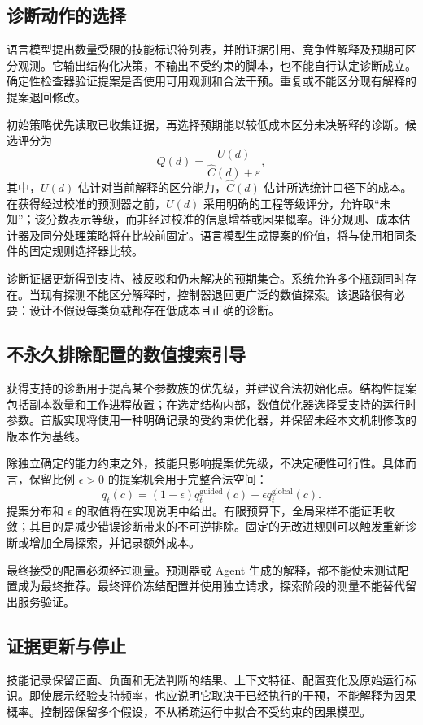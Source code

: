 \documentclass[preprint,12pt]{elsarticle}
\begin{document}
\subsection{诊断动作的选择}
语言模型提出数量受限的技能标识符列表，并附证据引用、竞争性解释及预期可区分观测。它输出结构化决策，不输出不受约束的脚本，也不能自行认定诊断成立。确定性检查器验证提案是否使用可用观测和合法干预。重复或不能区分现有解释的提案退回修改。

初始策略优先读取已收集证据，再选择预期能以较低成本区分未决解释的诊断。候选评分为
\begin{equation}
 Q(d)=\frac{U(d)}{\widehat C(d)+\varepsilon},
\end{equation}
其中，$U(d)$ 估计对当前解释的区分能力，$\widehat C(d)$ 估计所选统计口径下的成本。在获得经过校准的预测器之前，$U(d)$ 采用明确的工程等级评分，允许取“未知”；该分数表示等级，而非经过校准的信息增益或因果概率。评分规则、成本估计器及同分处理策略将在比较前固定。语言模型生成提案的价值，将与使用相同条件的固定规则选择器比较。

诊断证据更新得到支持、被反驳和仍未解决的预期集合。系统允许多个瓶颈同时存在。当现有探测不能区分解释时，控制器退回更广泛的数值探索。该退路很有必要：设计不假设每类负载都存在低成本且正确的诊断。

\subsection{不永久排除配置的数值搜索引导}
获得支持的诊断用于提高某个参数族的优先级，并建议合法初始化点。结构性提案包括副本数量和工作进程放置；在选定结构内部，数值优化器选择受支持的运行时参数。首版实现将使用一种明确记录的受约束优化器，并保留未经本文机制修改的版本作为基线。

除独立确定的能力约束之外，技能只影响提案优先级，不决定硬性可行性。具体而言，保留比例 $\epsilon>0$ 的提案机会用于完整合法空间：
\begin{equation}
 q_t(c)=(1-\epsilon)q_t^{\mathrm{guided}}(c)
                 +\epsilon q_t^{\mathrm{global}}(c).
\end{equation}
提案分布和 $\epsilon$ 的取值将在实现说明中给出。有限预算下，全局采样不能证明收敛；其目的是减少错误诊断带来的不可逆排除。固定的无改进规则可以触发重新诊断或增加全局探索，并记录额外成本。

最终接受的配置必须经过测量。预测器或 Agent 生成的解释，都不能使未测试配置成为最终推荐。最终评价冻结配置并使用独立请求，探索阶段的测量不能替代留出服务验证。

\subsection{证据更新与停止}
技能记录保留正面、负面和无法判断的结果、上下文特征、配置变化及原始运行标识。即使展示经验支持频率，也应说明它取决于已经执行的干预，不能解释为因果概率。控制器保留多个假设，不从稀疏运行中拟合不受约束的因果模型。
\end{document}
